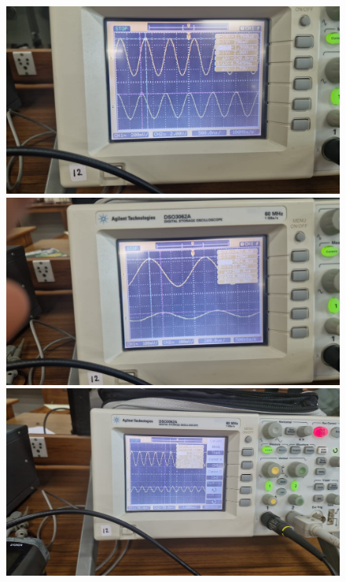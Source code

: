 \documentclass[a4paper,12pt]{article}
\begin{document}
\begin{figure}[h]
    \centering
    \begin{minipage}{0.3\textwidth}
        \centering
        \includegraphics[width=\textwidth]{fig/Fig1 (1).jpg}
    \end{minipage}
    \begin{minipage}{0.3\textwidth}
        \centering
        \includegraphics[width=\textwidth]{fig/Fig1 (2).jpg}
    \end{minipage}
    \begin{minipage}{0.3\textwidth}
        \centering
        \includegraphics[width=\textwidth]{fig/Fig1 (3).jpg}
    \end{minipage}


\end{figure}
\end{document}
